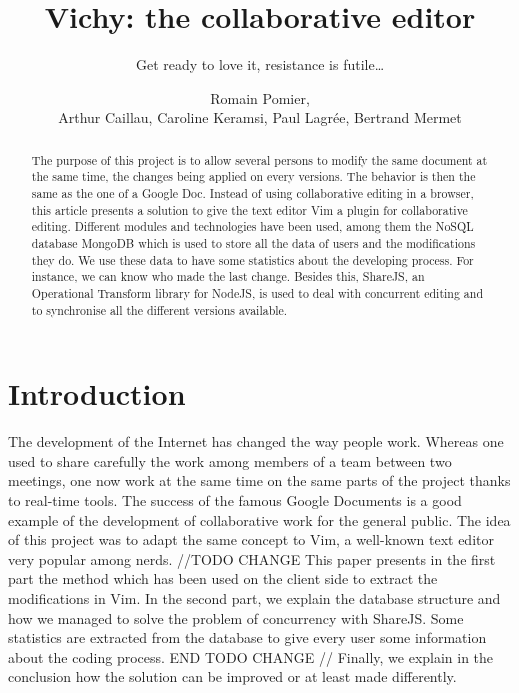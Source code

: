 \documentclass{llncs}
\begin{document}
\title{Vichy: the collaborative editor}
\subtitle{Get ready to love it, resistance is futile\ldots}

\author{Romain Pomier,\\Arthur Caillau, Caroline Keramsi, Paul Lagrée, Bertrand Mermet}

\maketitle

\begin{abstract}

The purpose of this project is to allow several persons to modify the same
document at the same time, the changes being applied on every versions.
The behavior is then the same as the one of a Google Doc.
Instead of using collaborative editing in a browser, this article presents a
solution to give the text editor Vim a plugin for collaborative editing.
Different modules and technologies have been used, among them the NoSQL
database MongoDB which is used to store all the data of users and the
modifications they do.
We use these data to have some statistics about the developing process.
For instance, we can know who made the last change. Besides this, ShareJS, an
Operational Transform library for NodeJS, is used to deal with concurrent
editing and to synchronise all the different versions available.

\end{abstract}

\section{Introduction}\label{sec:Introduction}

The development of the Internet has changed the way people work.
Whereas one used to share carefully the work among members of a team between
two meetings, one now work at the same time on the same parts of the project
thanks to real-time tools.
The success of the famous Google Documents is a good example of the development
of collaborative work for the general public.
The idea of this project was to adapt the same concept to Vim, a well-known
text editor very popular among nerds.
//TODO CHANGE
This paper presents in the first part the method which has been used on the
client side to extract the modifications in Vim.
In the second part, we explain the database structure and how we managed to
solve the problem of concurrency with ShareJS.
Some statistics are extracted from the database to give every user some
information about the coding process.
END TODO CHANGE //
Finally, we explain in the conclusion how the solution can be improved or at
least made differently.
\end{document}
